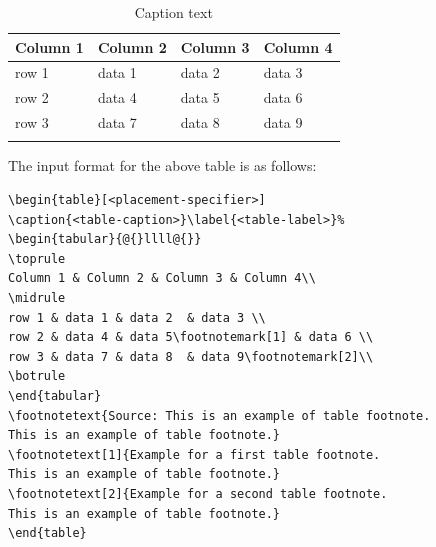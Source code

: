 \documentclass[pdflatex,sn-mathphys-num]{sn-jnl}%
\theoremstyle{thmstyleone}%
\theoremstyle{thmstyletwo}%
\theoremstyle{thmstylethree}%
\begin{document}
\begin{table}[h]
\caption{Caption text}\label{tab1}%
\begin{tabular}{@{}llll@{}}
\toprule
Column 1 & Column 2  & Column 3 & Column 4\\
\midrule
row 1    & data 1   & data 2  & data 3  \\
row 2    & data 4   & data 5\footnotemark[1]  & data 6  \\
row 3    & data 7   & data 8  & data 9\footnotemark[2]  \\
\botrule
\end{tabular}
\end{table}

\noindent
The input format for the above table is as follows:

\bigskip
\begin{verbatim}
\begin{table}[<placement-specifier>]
\caption{<table-caption>}\label{<table-label>}%
\begin{tabular}{@{}llll@{}}
\toprule
Column 1 & Column 2 & Column 3 & Column 4\\
\midrule
row 1 & data 1 & data 2	 & data 3 \\
row 2 & data 4 & data 5\footnotemark[1] & data 6 \\
row 3 & data 7 & data 8	 & data 9\footnotemark[2]\\
\botrule
\end{tabular}
\footnotetext{Source: This is an example of table footnote. 
This is an example of table footnote.}
\footnotetext[1]{Example for a first table footnote.
This is an example of table footnote.}
\footnotetext[2]{Example for a second table footnote. 
This is an example of table footnote.}
\end{table}
\end{verbatim}
\bigskip
\end{document}
